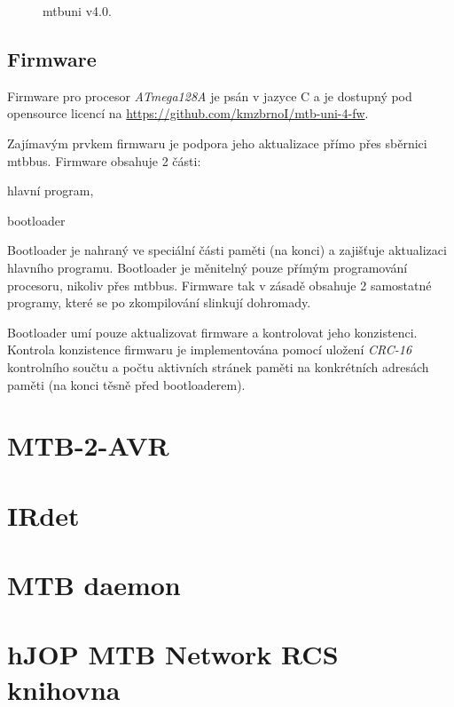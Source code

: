 \begin{figure}[ht]
\caption{\gls{mtbuni} v4.0.}
\label{fig:mtb-uni-v4}
\end{figure}

\subsection{Firmware}

Firmware pro procesor \textit{ATmega128A} je psán v jazyce C a je dostupný
pod opensource licencí na \url{https://github.com/kmzbrnoI/mtb-uni-4-fw}.

Zajímavým prvkem firmwaru je podpora jeho aktualizace přímo přes sběrnici
\gls{mtbbus}. Firmware obsahuje 2 části:

\begin{compactenum}
\item hlavní program,
\item bootloader
\end{compactenum}

Bootloader je nahraný ve speciální části paměti (na konci) a zajišťuje
aktualizaci hlavního programu. Bootloader je měnitelný pouze přímým
programování procesoru, nikoliv přes \gls{mtbbus}. Firmware tak v zásadě
obsahuje 2 samostatné programy, které se po zkompilování slinkují dohromady.

Bootloader umí pouze aktualizovat firmware a kontrolovat jeho konzistenci.
Kontrola konzistence firmwaru je implementována pomocí uložení \textit{CRC-16}
kontrolního součtu a počtu aktivních stránek paměti na konkrétních adresách
paměti (na konci těsně před bootloaderem).

\section{MTB-2-AVR}


\section{IRdet}


\section{MTB daemon}


\section{hJOP MTB Network RCS knihovna}
